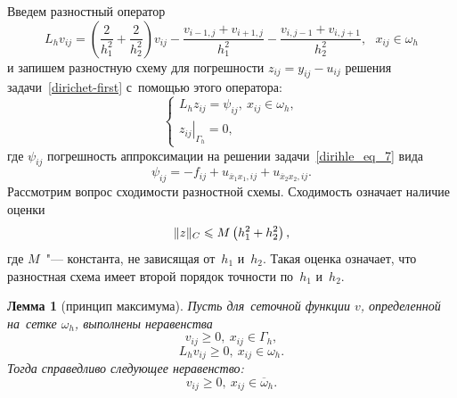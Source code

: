 \documentclass[11pt,a4paper,twoside]{report}
\numberwithin{equation}{section}
\theoremstyle{definition}
\theoremstyle{plain}
\newtheorem*{lemma*}{Лемма}
\DeclarePairedDelimiter\norm{\lVert}{\rVert}
\begin{document}
%
Введем разностный оператор
%
$$
    L_hv_{ij} = \left(\frac{2}{h_1^2}+\frac{2}{h_2^2}\right)v_{ij}-
    \frac{v_{i-1,j}+v_{i+1,j}}{h_1^2} - \frac{v_{i,j-1}+v_{i,j+1}}{h_2^2},
    ~~~x_{ij}\in\omega_h
$$
%
и запишем разностную схему для погрешности $z_{ij} = y_{ij} - u_{ij}$
решения задачи~\eqref{dirichet-first}
с~помощью этого оператора:
%
\begin{equation}
    \label{err-scheme}
    \begin{cases}
        L_hz_{ij}=\psi_{ij},~x_{ij}\in\omega_h,\\
        \left.z_{ij}\right\vert_{\Gamma_h}=0,
    \end{cases}
\end{equation}
%
где $\psi_{ij}$ погрешность
аппроксимации на решении задачи~\eqref{dirihle_eq_7} вида
%
$$
    \psi_{ij} = -f_{ij} + u_{\overline{x}_1x_1,ij} + u_{\overline{x}_2x_2,ij}.
$$
%
Рассмотрим вопрос сходимости разностной схемы. Сходимость означает наличие
оценки
%
$$
    \norm{z}_C \leqslant M\left(h_1^2 + h_2^2\right),
$$
%
где $M$~"--- константа, не зависящая от~$h_1$ и~$h_2$. Такая оценка означает, что
разностная схема имеет второй порядок точности по~$h_1$ и~$h_2$.
%
\begin{lemma*}[принцип максимума]
    Пусть для~сеточной функции $v$, определенной на~сетке $\omega_h$, выполнены
    неравенства
    $$
        v_{ij} \geqslant 0,~x_{ij} \in \Gamma_h,
    $$
    $$
        L_hv_{ij} \geqslant 0,~x_{ij} \in \omega_h.
    $$
    Тогда справедливо следующее неравенство:
    $$
        v_{ij} \geqslant 0,~x_{ij}\in\overline{\omega}_h.
    $$
\end{lemma*}
%
%
\end{document}
